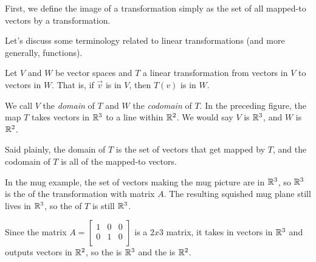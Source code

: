 \documentclass{ximera}
\begin{document}
First, we define the image of a transformation simply as the set of all mapped-to vectors by a transformation.

Let's discuss some terminology related to linear transformations (and more generally, functions). 

\begin{definition}
  Let $V$ and $W$ be vector spaces and $T$ a linear transformation from vectors in $V$ to vectors in $W$. That is, if $\vec{v}$ is in $V$, then $T(v)$ is in $W$.

  \begin{center}
    \end{center}

  We call $V$ the \emph{domain} of $T$ and $W$ the \emph{codomain} of $T$. In the preceding figure, the map $T$ takes vectors in $\mathbb{R}^3$ to a line within $\mathbb{R}^2$. We would say $V$ is $\mathbb{R}^3$, and $W$ is $\mathbb{R}^2$.
\end{definition}

Said plainly, the domain of $T$ is the set of vectors that get mapped by $T$, and the codomain of $T$ is all of the mapped-to vectors. 

In the mug example, the set of vectors making the mug picture are in $\mathbb{R}^3$, so $\mathbb{R}^3$ is the  of the transformation with matrix $A$. The resulting squished mug plane still lives in $\mathbb{R}^3$, so the  of $T$ is still $\mathbb{R}^3$. 

Since the matrix $A=\begin{bmatrix}
  1&0&0\\
  0&1&0\\
\end{bmatrix}$ is a $2x3$ matrix, it takes in vectors in $\mathbb{R}^3$ and outputs vectors in $\mathbb{R}^2$, so the  is $\mathbb{R}^3$ and the  is $\mathbb{R}^2$.
\end{document}
